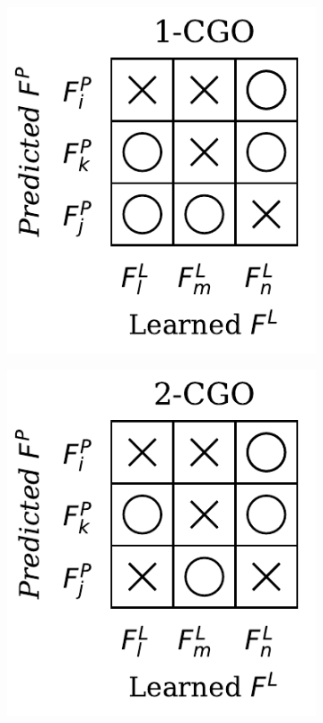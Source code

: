 \begin{figure}[H]
\begin{subfigure}[b]{0.17\textwidth}
            \includegraphics[width=\textwidth]{img/datasets/_1-CGO.pdf}
        \end{subfigure}
        \hfill
        \begin{subfigure}[b]{0.17\textwidth}
            \includegraphics[width=\textwidth]{img/datasets/_2-CGO.pdf}

\end{subfigure}
\end{figure}
